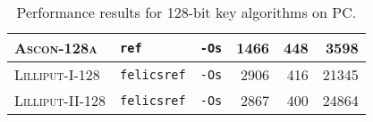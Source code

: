 \begin{table}[H]
\begin{tabular}{l|l|l||r|r|r}
      \textsc{Ascon-128a}      & \texttt{ref}       & \texttt{-Os}             &                   1466 &              448 &                             3598 \\ \hline
      \textsc{Lilliput-I-128}  & \texttt{felicsref} & \texttt{-Os}             &                   2906 &              416 &                            21345 \\ \hline
      \textsc{Lilliput-II-128} & \texttt{felicsref} & \texttt{-Os}             &                   2867 &              400 &                            24864 \\ \hline
  \end{tabular}
  \caption{Performance results for 128-bit key algorithms on PC.}
  \label{table:results/128-pc}
\end{table}
